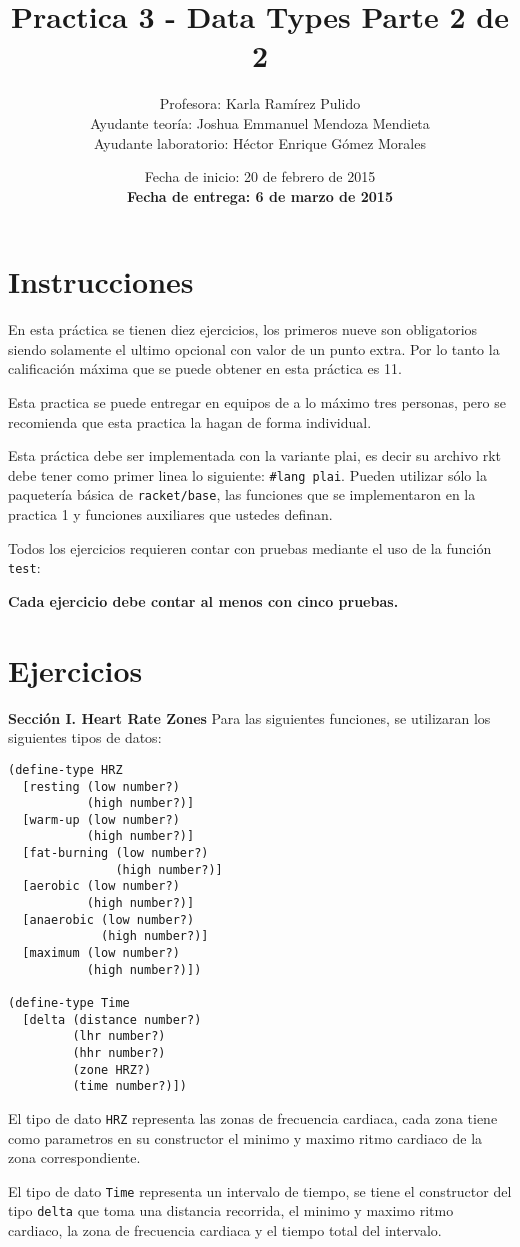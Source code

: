 \documentclass{article}
\author{Profesora: Karla Ramírez Pulido\\
  Ayudante teoría: Joshua Emmanuel Mendoza Mendieta\\
  Ayudante laboratorio: Héctor Enrique Gómez Morales}
\title{Practica 3 - Data Types Parte 2 de 2}
\date{Fecha de inicio: 20 de febrero de 2015\\
  \textbf{Fecha de entrega: 6 de marzo de 2015}}
\begin{document}
\maketitle
\section{Instrucciones}
En esta práctica se tienen diez ejercicios, los primeros nueve son
obligatorios siendo solamente el ultimo opcional con valor de un
punto extra. Por lo tanto la calificación máxima que se puede obtener en
esta práctica es 11.

Esta practica se puede entregar en equipos de a lo máximo tres
personas, pero se recomienda que esta practica la hagan de forma
individual.

Esta práctica debe ser implementada con la variante plai, es decir
su archivo rkt debe tener como primer linea lo siguiente:
\texttt{\#lang plai}. Pueden utilizar sólo la paquetería básica de
\texttt{racket/base}, las funciones que se implementaron en la
practica 1 y funciones auxiliares que ustedes definan.

Todos los ejercicios requieren contar con pruebas mediante el uso de
la función \texttt{test}:

\textbf{Cada ejercicio debe contar al menos con cinco pruebas.}

\section{Ejercicios}
\textbf{Sección I. Heart Rate Zones} Para las siguientes funciones, se utilizaran los siguientes tipos de datos:
\begin{verbatim}
(define-type HRZ
  [resting (low number?)
           (high number?)]
  [warm-up (low number?)
           (high number?)]
  [fat-burning (low number?)
               (high number?)]
  [aerobic (low number?)
           (high number?)]
  [anaerobic (low number?)
             (high number?)]
  [maximum (low number?)
           (high number?)])

(define-type Time
  [delta (distance number?)
         (lhr number?)
         (hhr number?)
         (zone HRZ?)
         (time number?)])
\end{verbatim}

El tipo de dato \verb;HRZ; representa las zonas de frecuencia cardiaca,
cada zona tiene como parametros en su constructor el minimo y maximo ritmo cardiaco
de la zona correspondiente.

El tipo de dato \verb;Time; representa un intervalo de tiempo, se tiene el constructor del tipo \verb;delta; que toma una distancia recorrida, el minimo y maximo ritmo cardiaco, la zona de frecuencia cardiaca y el tiempo total del intervalo.
\end{document}
